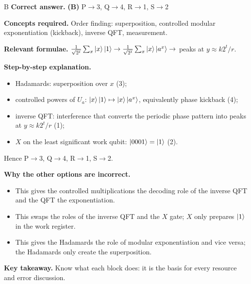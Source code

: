 \documentclass[11pt,a4paper]{article}
\newcommand{\qsep}{\par\vspace{2pt}{\color{black!15}\hrule}\vspace{4pt}}
\begin{document}
\begin{solbox}{B}
\textbf{\color{brand}Correct answer.} \textcolor{okgreen}{\textbf{(B)}} P$\to$3, Q$\to$4, R$\to$1, S$\to$2

\textbf{\color{brand}Concepts required.} Order finding: superposition, controlled modular exponentiation (kickback), inverse QFT, measurement.

\textbf{\color{brand}Relevant formulae.} $\frac{1}{\sqrt{2^t}}\sum_x\ket x\ket1 \to \frac{1}{\sqrt{2^t}}\sum_x\ket x\ket{a^x} \to$ peaks at $y \approx k2^t/r$.

\textbf{\color{brand}Step-by-step explanation.} \begin{itemize}\itemsep0pt
\item Hadamards: superposition over $x$ (3);
\item controlled powers of $U_a$: $\ket x\ket1 \mapsto \ket x\ket{a^x}$, equivalently phase kickback (4);
\item inverse QFT: interference that converts the periodic phase pattern into peaks at $y \approx k2^t/r$ (1);
\item $X$ on the least significant work qubit: $\ket{0001} = \ket1$ (2).
\end{itemize}
Hence P$\to$3, Q$\to$4, R$\to$1, S$\to$2.

\textbf{\color{brand}Why the other options are incorrect.}
\begin{itemize}[leftmargin=2.4em, itemsep=1pt, topsep=2pt]
\item[\textbf{(A)}] This gives the controlled multiplications the decoding role of the inverse QFT and the QFT the exponentiation.
\item[\textbf{(C)}] This swaps the roles of the inverse QFT and the $X$ gate; $X$ only prepares $\ket1$ in the work register.
\item[\textbf{(D)}] This gives the Hadamards the role of modular exponentiation and vice versa; the Hadamards only create the superposition.
\end{itemize}
\textbf{\color{brand}Key takeaway.} Know what each block does: it is the basis for every resource and error discussion.
\end{solbox}
\qsep
\end{document}
